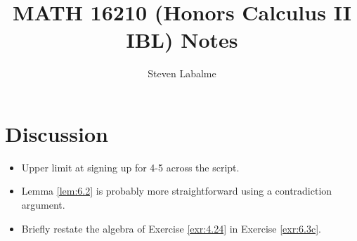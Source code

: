 \documentclass{report}
\title{MATH 16210 (Honors Calculus II IBL) Notes}
\author{Steven Labalme}
\begin{document}
\maketitle



\tableofcontents
\newpage



\pagestyle{main}
\renewcommand{\chaptermark}[1]{\markboth{\chaptername\ \thechapter}{}}
\setcounter{chapter}{5}



\section{Discussion}
\begin{itemize}
    \item Upper limit at signing up for 4-5 across the script.
    \item Lemma \ref{lem:6.2} is probably more straightforward using a contradiction argument.
    \item Briefly restate the algebra of Exercise \ref{exr:4.24} in Exercise \ref{exr:6.3c}.
\end{itemize}
\end{document}

